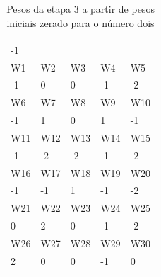 \documentclass[11pt]{article}
\begin{document}
\begin{table}[]
\centering
\caption{Pesos da etapa 3 a partir de pesos iniciais zerado para o número dois}
\label{tab:wp2z_3}
\begin{tabular}{lllll}
\cellcolor[HTML]{000000}{\color[HTML]{FFFFFF} W0} &                            &                            &                            &                            \\
-1                                                &                            &                            &                            &                            \\
\rowcolor[HTML]{000000}
{\color[HTML]{FFFFFF} W1}                         & {\color[HTML]{FFFFFF} W2}  & {\color[HTML]{FFFFFF} W3}  & {\color[HTML]{FFFFFF} W4}  & {\color[HTML]{FFFFFF} W5}  \\
-1                                                & 0                          & 0                          & -1                         & -2                         \\
\rowcolor[HTML]{000000}
{\color[HTML]{FFFFFF} W6}                         & {\color[HTML]{FFFFFF} W7}  & {\color[HTML]{FFFFFF} W8}  & {\color[HTML]{FFFFFF} W9}  & {\color[HTML]{FFFFFF} W10} \\
-1                                                & 1                          & 0                          & 1                          & -1                         \\
\rowcolor[HTML]{000000}
{\color[HTML]{FFFFFF} W11}                        & {\color[HTML]{FFFFFF} W12} & {\color[HTML]{FFFFFF} W13} & {\color[HTML]{FFFFFF} W14} & {\color[HTML]{FFFFFF} W15} \\
-1                                                & -2                         & -2                         & -1                         & -2                         \\
\rowcolor[HTML]{000000}
{\color[HTML]{FFFFFF} W16}                        & {\color[HTML]{FFFFFF} W17} & {\color[HTML]{FFFFFF} W18} & {\color[HTML]{FFFFFF} W19} & {\color[HTML]{FFFFFF} W20} \\
-1                                                & -1                         & 1                          & -1                         & -2                         \\
\rowcolor[HTML]{000000}
{\color[HTML]{FFFFFF} W21}                        & {\color[HTML]{FFFFFF} W22} & {\color[HTML]{FFFFFF} W23} & {\color[HTML]{FFFFFF} W24} & {\color[HTML]{FFFFFF} W25} \\
0                                                 & 2                          & 0                          & -1                         & -2                         \\
\rowcolor[HTML]{000000}
{\color[HTML]{FFFFFF} W26}                        & {\color[HTML]{FFFFFF} W27} & {\color[HTML]{FFFFFF} W28} & {\color[HTML]{FFFFFF} W29} & {\color[HTML]{FFFFFF} W30} \\
2                                                 & 0                          & 0                          & -1                         & 0
\end{tabular}
\end{table}
\end{document}
